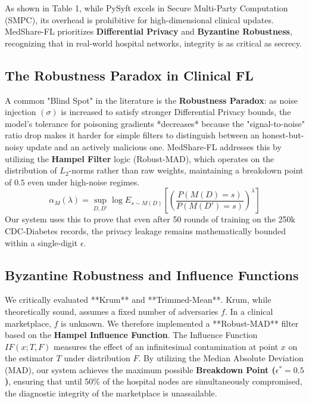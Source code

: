 \documentclass[10pt, a4paper, twocolumn]{article}
\begin{document}
As shown in Table 1, while PySyft excels in Secure Multi-Party Computation (SMPC), its overhead is prohibitive for high-dimensional clinical updates. MedShare-FL prioritizes \textbf{Differential Privacy} and \textbf{Byzantine Robustness}, recognizing that in real-world hospital networks, integrity is as critical as secrecy.

\subsection{The Robustness Paradox in Clinical FL}
A common "Blind Spot" in the literature is the \textbf{Robustness Paradox}: as noise injection $(\sigma)$ is increased to satisfy stronger Differential Privacy bounds, the model's tolerance for poisoning gradients *decreases* because the "signal-to-noise" ratio drop makes it harder for simple filters to distinguish between an honest-but-noisy update and an actively malicious one. MedShare-FL addresses this by utilizing the \textbf{Hampel Filter} logic (Robust-MAD), which operates on the distribution of $L_2$-norms rather than raw weights, maintaining a breakdown point of $0.5$ even under high-noise regimes.
\begin{equation}
    \alpha_M(\lambda) = \sup_{D, D'} \log E_{s \sim M(D)} [ (\frac{P(M(D)=s)}{P(M(D')=s)})^{\lambda} ]
\end{equation}
Our system uses this to prove that even after 50 rounds of training on the 250k CDC-Diabetes records, the privacy leakage remains mathematically bounded within a single-digit $\epsilon$.

\subsection{Byzantine Robustness and Influence Functions}
We critically evaluated **Krum** \cite{blanchard2017} and **Trimmed-Mean**. Krum, while theoretically sound, assumes a fixed number of adversaries $f$. In a clinical marketplace, $f$ is unknown. We therefore implemented a **Robust-MAD** filter based on the \textbf{Hampel Influence Function}. The Influence Function $IF(x; T, F)$ measures the effect of an infinitesimal contamination at point $x$ on the estimator $T$ under distribution $F$. By utilizing the Median Absolute Deviation (MAD), our system achieves the maximum possible \textbf{Breakdown Point ($\epsilon^* = 0.5$)}, ensuring that until 50\% of the hospital nodes are simultaneously compromised, the diagnostic integrity of the marketplace is unassailable.
\end{document}
